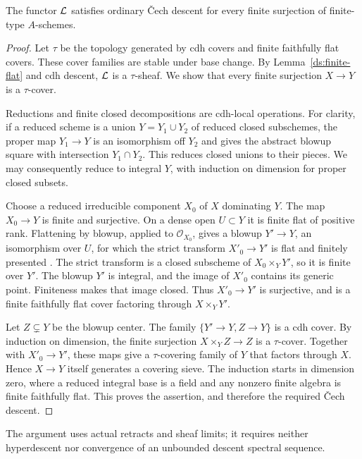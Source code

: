 \begin{lemma}
\label{ds:finite-surjection}
The functor $\mathcal{L}$ satisfies ordinary \v{C}ech descent for every
finite surjection of finite-type $A$-schemes.
\end{lemma}

\begin{proof}
Let $\tau$ be the topology generated by cdh covers and finite
faithfully flat covers. These cover families are stable under base
change. By Lemma~\ref{ds:finite-flat} and cdh descent, $\mathcal{L}$ is a
$\tau$-sheaf. We show that every finite surjection $X\to Y$ is a
$\tau$-cover.

Reductions and finite closed decompositions are cdh-local
operations. For clarity, if a reduced scheme is a union
$Y=Y_1\cup Y_2$ of reduced closed subschemes, the proper map
$Y_1\to Y$ is an isomorphism off $Y_2$ and gives the abstract
blowup square with intersection $Y_1\cap Y_2$. This reduces closed
unions to their pieces. We may consequently reduce to integral
$Y$, with induction on dimension for proper closed subsets.

Choose a reduced irreducible component $X_0$ of $X$ dominating
$Y$. The map $X_0\to Y$ is finite and surjective. On a dense open
$U\subset Y$ it is finite flat of positive rank. Flattening by
blowup, applied to $\mathcal O_{X_0}$, gives a blowup
$Y'\to Y$, an isomorphism over $U$, for which the strict transform
$X'_0\to Y'$ is flat and finitely presented
\cite[Tag~0815]{Stacks}. The strict transform is a closed subscheme
of $X_0\times_Y Y'$, so it is finite over $Y'$. The blowup $Y'$ is
integral, and the image of $X'_0$ contains its generic point.
Finiteness makes that image closed. Thus $X'_0\to Y'$ is
surjective, and is a finite faithfully flat cover factoring through
$X\times_Y Y'$.

Let $Z\subsetneq Y$ be the blowup center. The family
$\{Y'\to Y,Z\to Y\}$ is a cdh cover. By induction on dimension,
the finite surjection $X\times_Y Z\to Z$ is a $\tau$-cover.
Together with $X'_0\to Y'$, these maps give a $\tau$-covering
family of $Y$ that factors through $X$. Hence $X\to Y$ itself
generates a covering sieve. The induction starts in dimension zero,
where a reduced integral base is a field and any nonzero finite
algebra is finite faithfully flat. This proves the assertion, and
therefore the required \v{C}ech descent.
\end{proof}

The argument uses actual retracts and sheaf limits; it requires
neither hyperdescent nor convergence of an unbounded descent
spectral sequence.

